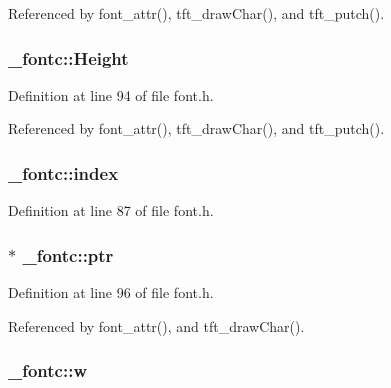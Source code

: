 Referenced by font\-\_\-attr(), tft\-\_\-draw\-Char(), and tft\-\_\-putch().

\hypertarget{struct__fontc_a98f97c237dfb1027c38813a17ef6dcd6}{
\subsubsection[{Height}]{ \-\_\-fontc\-::\-Height}}\label{struct__fontc_a98f97c237dfb1027c38813a17ef6dcd6}


Definition at line 94 of file font.\-h.



Referenced by font\-\_\-attr(), tft\-\_\-draw\-Char(), and tft\-\_\-putch().

\hypertarget{struct__fontc_a7cc0370744ff7ea964054d36917c9a2f}{
\subsubsection[{index}]{ \-\_\-fontc\-::index}}\label{struct__fontc_a7cc0370744ff7ea964054d36917c9a2f}


Definition at line 87 of file font.\-h.

\hypertarget{struct__fontc_a60a3fef5ccd80dff543aac3f22f74876}{
\subsubsection[{ptr}]{ $\ast$ \-\_\-fontc\-::ptr}}\label{struct__fontc_a60a3fef5ccd80dff543aac3f22f74876}


Definition at line 96 of file font.\-h.



Referenced by font\-\_\-attr(), and tft\-\_\-draw\-Char().

\hypertarget{struct__fontc_a9c2af0354d2b2009e7b6684e25fd479b}{
\subsubsection[{w}]{ \-\_\-fontc\-::w}}\label{struct__fontc_a9c2af0354d2b2009e7b6684e25fd479b}


